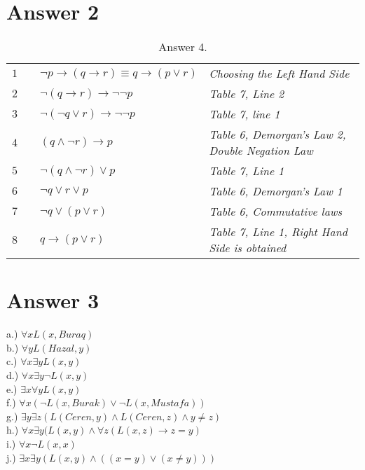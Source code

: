 \documentclass[12pt]{article}
\begin{document}
\section*{Answer 2}
\begin{table}[H]
	\centering
	\caption{Answer 4.}
	\begin{tabular}{*4{l}}
		$1$ & & $\neg p \rightarrow (q\rightarrow r) \equiv q \rightarrow (p \vee r)$ & \textit{Choosing the Left Hand Side} \\ 
		$2$ & & $\neg(q \rightarrow r) \rightarrow \neg \neg p$ & \textit{Table 7, Line 2}\\
		$3$ & & $\neg(\neg q \vee r) \rightarrow \neg \neg p$ & \textit{Table 7, line 1}\\
		$4$ & & $(q \wedge \neg r) \rightarrow p$ & \textit{Table 6, Demorgan's Law 2, Double Negation Law } \\

		$5$ & & $\neg(q \wedge \neg r) \vee p$ &\textit{Table 7, Line 1}\\ 
		
		$6$ & & $\neg q \vee r \vee p$ & \textit{Table 6, Demorgan's Law 1}\\
		
		$7$ & & $\neg q \vee (p \vee r)$ & \textit{Table 6, Commutative laws}\\ 
		
		$8$ & & $q \rightarrow(p \vee r)$ & \textit{Table 7, Line 1, Right Hand Side is obtained} \\
	\end{tabular}
\end{table}



\section*{Answer 3}
a.)
$\forall x L(x,Buraq)$ \\
b.)
$\forall y L(Hazal,y)$ \\
c.)
$\forall x \exists y L(x,y)$ \\
d.)
$\forall x \exists y \neg L(x,y)$ \\
e.)
$\exists x \forall y L(x,y)$ \\
f.)
$\forall x (\neg L(x,Burak) \vee \neg L(x,Mustafa)) $ \\
g.)
$\exists y \exists z (L(Ceren,y) \wedge L(Ceren,z) \wedge y \ne z)$ \\
h.)
$\forall x \exists y(L(x,y) \wedge \forall z(L(x,z)\rightarrow z=y)$ \\
i.)
$\forall x \neg L(x,x)$ \\
j.)
$\exists x \exists y (L(x,y) \wedge ((x=y) \vee (x \ne y)))$ \\
\end{document}
